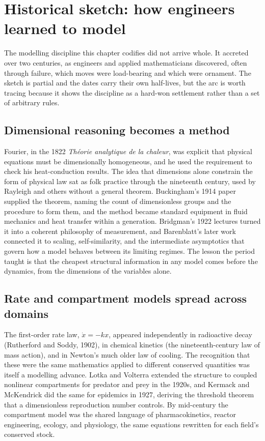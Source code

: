 \section{Historical sketch: how engineers learned to model}

The modelling discipline this chapter codifies did not arrive whole. It
accreted over two centuries, as engineers and applied mathematicians
discovered, often through failure, which moves were load-bearing and
which were ornament. The sketch is partial and the dates carry their
own half-lives, but the arc is worth tracing because it shows the
discipline as a hard-won settlement rather than a set of arbitrary
rules.

\subsection{Dimensional reasoning becomes a method}

Fourier, in the 1822 \emph{Th\'eorie analytique de la chaleur}, was
explicit that physical equations must be dimensionally homogeneous, and
he used the requirement to check his heat-conduction results. The idea
that dimensions alone constrain the form of physical law sat as folk
practice through the nineteenth century, used by Rayleigh and others
without a general theorem. Buckingham's 1914 paper
\cite{paper:buckingham1914} supplied the theorem, naming the count of
dimensionless groups and the procedure to form them, and the method
became standard equipment in fluid mechanics and heat transfer within a
generation. Bridgman's 1922 lectures \cite{text:bridgman1922}
turned it into a coherent philosophy of measurement, and Barenblatt's
later work \cite{text:barenblatt1996} connected it to scaling,
self-similarity, and the intermediate asymptotics that govern how a
model behaves between its limiting regimes. The lesson the period
taught is that the cheapest structural information in any model comes
before the dynamics, from the dimensions of the variables alone.

\subsection{Rate and compartment models spread across domains}

The first-order rate law, $\dot{x} = -kx$, appeared independently in
radioactive decay (Rutherford and Soddy, 1902), in chemical kinetics
(the nineteenth-century law of mass action), and in Newton's much older
law of cooling. The recognition that these were the same mathematics
applied to different conserved quantities was itself a modelling
advance. Lotka \cite{hist:v6c08-lotka-1925} and Volterra
\cite{hist:v6c08-volterra-1926} extended the structure to coupled
nonlinear compartments for predator and prey in the 1920s, and Kermack
and McKendrick \cite{paper:v6c08-kermack-mckendrick-1927} did the same
for epidemics in 1927, deriving the threshold theorem that a
dimensionless reproduction number controls. By mid-century the
compartment model was the shared language of pharmacokinetics, reactor
engineering, ecology, and physiology, the same equations rewritten for
each field's conserved stock.

